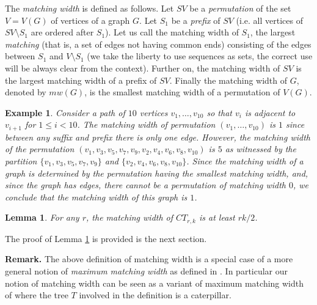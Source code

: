 \documentclass{article}
\newtheorem{lemma}{Lemma}
\newtheorem{example}{Example}
\begin{document}
The \emph{matching width} is defined as follows.
Let $SV$ be a \emph{permutation} of the set $V=V(G)$ of vertices of a graph
$G$. 
Let $S_1$ be a \emph{prefix} of $SV$ (i.e. all vertices of $SV \setminus S_1$ are ordered after
$S_1$). Let us call the matching width of $S_1$,
the largest \emph{matching} (that is, a set of edges not having common ends)
consisting of the edges between $S_1$ and $V \setminus S_1$
(we take the liberty to use sequences as sets, the correct use will be always clear
from the context). Further on, the matching width of $SV$ is the largest matching
width of a prefix of $SV$. Finally the matching width of $G$, denoted by $mw(G)$, is the smallest 
matching width of a permutation of $V(G)$. 

\begin{example}
Consider a path of $10$ vertices $v_1, \dots, v_{10}$ so that $v_i$ is adjacent to $v_{i+1}$ for
$1 \leq i<10$. The matching width of permutation $(v_1, \dots, v_{10})$ is $1$ since between any suffix
and prefix there is only one edge. However, the matching width of the permutation 
$(v_1,v_3,v_5,v_7,v_9,v_2,v_4,v_6,v_8,v_{10})$ is $5$ as witnessed by the partition
$\{v_1,v_3,v_5,v_7,v_9\}$ and $\{v_2,v_4,v_6,v_8,v_{10}\}$. Since the matching width of a graph is determined
by the permutation having the smallest matching width, and, since the graph has edges, there cannot be
a permutation of matching width $0$, we conclude that the matching width of this graph is $1$.
\end{example}

\begin{lemma} \label{cltreemt}
For any $r$,
the matching width of $CT_{r,k}$ is at least $rk/2$.
\end{lemma}

The proof of Lemma \ref{cltreemt} is provided is the next section.

{\bf Remark.} The above definition of matching width is a special 
case of a more general notion of \emph{maximum matching width} as defined
in \cite{VaThesis}. In particular our notion of matching width can be seen
as a variant of maximum matching width of \cite{VaThesis} 
where the tree $T$ involved in the definition is a caterpillar. 

\begin{comment}
Then, applying Lemma 4.2.4 of \cite{VaThesis} to this case, one
can observe that $pw(G) \leq 3mw(G)-1$, where $pw(G)$ is the pathwidth of $G$.
It is well known that the pathwidth of $T_r$ is at least $r/2$ \cite{Bod98}. Furthermore, since
all the vertices of a clique get into the same bag in any path decomposition, this
lower bound is immediately extended to $rk/2$ for $CT_{r,k}$, immediately implying
a bound slightly above $rk/6$ for $mw(G)$. 
\end{comment}
\end{document}
